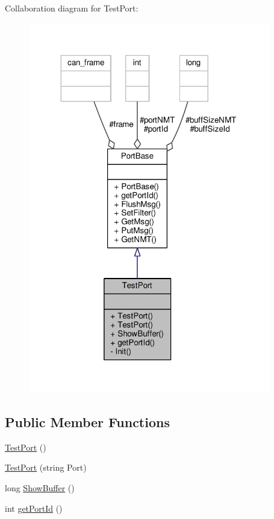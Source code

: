 Collaboration diagram for Test\+Port\+:\nopagebreak
\begin{figure}[H]
\begin{center}
\leavevmode
\includegraphics[width=299pt]{classTestPort__coll__graph}
\end{center}
\end{figure}
\subsection*{Public Member Functions}
\begin{DoxyCompactItemize}
\item 
\hyperlink{classTestPort_adde46780527e08b738eb5b32defa1c3a}{Test\+Port} ()
\item 
\hyperlink{classTestPort_a93293d14818c76db0b4ef1273cf5ce19}{Test\+Port} (string Port)
\item 
long \hyperlink{classTestPort_acc9bf1db6c1ca7d9040591306100ab36}{Show\+Buffer} ()
\item 
int \hyperlink{classTestPort_abf6a7327e26838aaf3e2e4482668085f}{get\+Port\+Id} ()
\end{DoxyCompactItemize}
